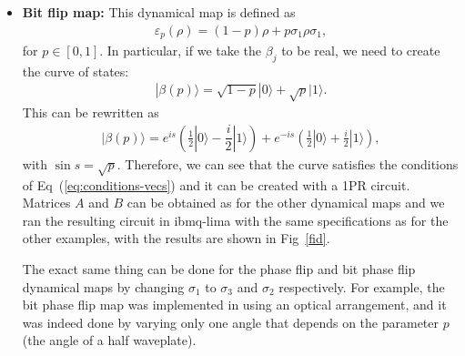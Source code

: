 \documentclass[10pt,letterpaper]{article} %
\newcommand{\fref}[1]{Fig~\ref{#1}}
\newcommand{\eref}[1]{Eq~(\ref{#1})}
\begin{document}
\begin{itemize}
\item \textbf{Bit flip map:} 
This dynamical map is defined as
\begin{align*}
\varepsilon_p(\rho) = (1-p)\rho + p\sigma_1 \rho \sigma_1,
\end{align*}
for $p \in [0,1]$. 
In particular, if we take the $\beta_j$ to be real,
we need to create the curve of states:
\begin{align*}
|\beta(p)\rangle = \sqrt{1-p} |0\rangle +\sqrt{p} |1\rangle.
\end{align*}
This can be rewritten as
\begin{align*}
|\beta(p) \rangle = e^{is}  \left(\frac{1}{2} |0\rangle - \dfrac{i}{2} |1\rangle \right) + e^{-is} \left( \frac{1}{2} |0\rangle + \frac{i}{2} |1\rangle \right),
\end{align*}
with $\sin s= \sqrt{p}$.
Therefore, we can see that the curve satisfies the conditions of  \eref{eq:conditions-vecs} 
and it can be created with a 1PR circuit.
Matrices $A$ and $B$ can be obtained as for the other
dynamical maps and we ran the resulting circuit in ibmq-lima with the same
specifications as for the other examples,
with the results are shown in \fref{fid}.

The exact same thing can be done
for the phase flip and bit phase flip dynamical maps by
changing $\sigma_1$ to
$\sigma_3$ and $\sigma_2$ respectively.
For example, the bit phase flip map was implemented in \cite{Andrea, Andrea_4qb} 
using an optical arrangement, and  it was indeed done 
by varying only one angle that depends on the parameter $p$ (the angle of a half waveplate). 
\end{itemize}
\end{document}
